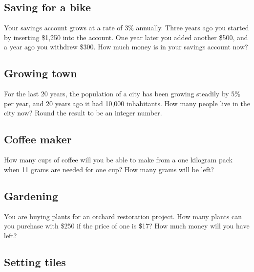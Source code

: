
\subsection{Saving for a bike}

Your savings account grows at a rate of 3\% annually. Three years ago you 
started by inserting \$1,250 into the account. One year later 
you added another \$500, and a year ago you withdrew \$300. 
How much money is in your savings account now?


\subsection{Growing town}

For the last 20 years, the population of a city has been growing 
steadily by 5\% per year, and 20 years ago it had 10,000 inhabitants.
How many people live in the city now? Round the result to be an 
integer number.


\subsection{Coffee maker}

How many cups of coffee will you be able to make from a one kilogram
pack when 11 grams are needed for one cup? How many grams will be 
left?


\subsection{Gardening}

You are buying plants for an orchard restoration project.
How many plants can you purchase with \$250 if the price 
of one is \$17? How much money will you have left?  


\subsection{Setting tiles}

